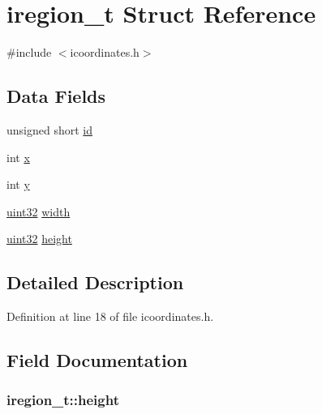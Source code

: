 \hypertarget{structiregion__t}{\section{iregion\-\_\-t Struct Reference}
\label{structiregion__t}
}


{\ttfamily \#include $<$icoordinates.\-h$>$}

\subsection*{Data Fields}
\begin{DoxyCompactItemize}
\item 
unsigned short \hyperlink{structiregion__t_a09ef2d2779286827357a7c3290e65d9a}{id}
\item 
int \hyperlink{structiregion__t_a244884f21e4d054538530e389755ac3e}{x}
\item 
int \hyperlink{structiregion__t_a8b975f923a92e3969b4aec3d935af310}{y}
\item 
\hyperlink{itypes_8h_a1134b580f8da4de94ca6b1de4d37975e}{uint32} \hyperlink{structiregion__t_abcafee0857bd757384813e53ddf879d9}{width}
\item 
\hyperlink{itypes_8h_a1134b580f8da4de94ca6b1de4d37975e}{uint32} \hyperlink{structiregion__t_ac7c841eeb48c334a9a7182480855d251}{height}
\end{DoxyCompactItemize}


\subsection{Detailed Description}


Definition at line 18 of file icoordinates.\-h.



\subsection{Field Documentation}
\hypertarget{structiregion__t_ac7c841eeb48c334a9a7182480855d251}{
\subsubsection[{height}]{ iregion\-\_\-t\-::height}}\label{structiregion__t_ac7c841eeb48c334a9a7182480855d251}


